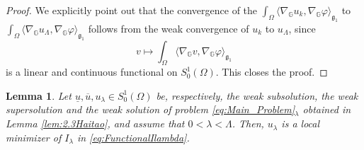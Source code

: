 \documentclass[11pt]{amsart}
\numberwithin{equation}{section} %
\newtheorem{lemma}[teo]{Lemma}
\theoremstyle{definition}
\begin{document}
\begin{proof}
	We explicitly
	point out that the convergence of the 
	$\int_{\Omega}\langle \nabla_{\mathbb{G}}u_k,\nabla_{\mathbb{G}}\varphi\rangle_{\mathfrak{g}_{1}}$ 
	to $\int_{\Omega}\langle \nabla_{\mathbb{G}}u_{\Lambda},\nabla_{\mathbb{G}}\varphi\rangle_{\mathfrak{g}_{1}}$ follows
	from the weak convergence of $u_k$ to $u_{\Lambda}$, since 
	$$v\mapsto \int_{\Omega}\langle \nabla_{\mathbb{G}}v,\nabla_{\mathbb{G}}\varphi\rangle_{\mathfrak{g}_{1}}$$
	is a linear and continuous functional on $S^{1}_{0}(\Omega)$. This closes the proof.
\end{proof}


\begin{lemma} \label{lem:25Haitao}
	Let $\underline{u},\overline{u},u_\lambda
	\in S^{1}_{0}(\Omega)$ be, respectively, the weak subsolution, 
	the we\-ak supersolution and the weak solution of problem \eqref{eq:Main_Problem}$_\lambda$
	obtained in Lemma \ref{lem:2.3Haitao}, and assume that $0<\lambda<\Lambda$.
	Then, $u_\lambda$ is a \emph{local minimizer} of $I_{\lambda}$
	in \eqref{eq:FunctionalIlambda}.
\end{lemma}
\end{document}
